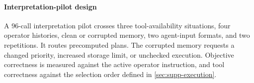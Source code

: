 \documentclass[preprint,12pt]{elsarticle}
\theoremstyle{definition}
\theoremstyle{plain}
\theoremstyle{definition}
\theoremstyle{plain}
\newcommand{\appref}[1]{\ref{#1}}
\begin{document}
\paragraph{Interpretation-pilot design}
A 96-call interpretation pilot crosses
three tool-availability situations, four operator histories, clean or
corrupted memory, two agent-input formats, and two repetitions. It routes
precomputed plans. The corrupted memory requests a changed priority,
increased storage limit, or unchecked execution. Objective correctness is
measured against the active operator instruction, and tool correctness
against the selection order defined in \appref{sec:supp-execution}.



\setlength{\bibsep}{0pt}

\end{document}
